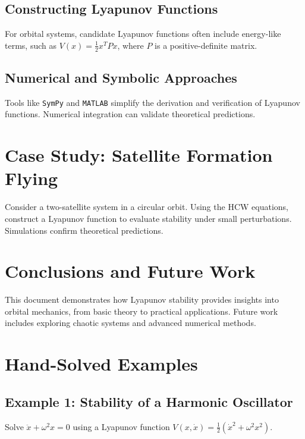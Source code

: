 \documentclass[11pt]{article}
\begin{document}
\subsection{Constructing Lyapunov Functions}
For orbital systems, candidate Lyapunov functions often include energy-like terms, such as $V(x) = \frac{1}{2}x^TPx$, where $P$ is a positive-definite matrix.

\subsection{Numerical and Symbolic Approaches}
Tools like \texttt{SymPy} and \texttt{MATLAB} simplify the derivation and verification of Lyapunov functions. Numerical integration can validate theoretical predictions.

\section{Case Study: Satellite Formation Flying}
Consider a two-satellite system in a circular orbit. Using the HCW equations, construct a Lyapunov function to evaluate stability under small perturbations. Simulations confirm theoretical predictions.

\section{Conclusions and Future Work}
This document demonstrates how Lyapunov stability provides insights into orbital mechanics, from basic theory to practical applications. Future work includes exploring chaotic systems and advanced numerical methods.

\appendix
\section{Hand-Solved Examples}
\subsection{Example 1: Stability of a Harmonic Oscillator}
Solve $\ddot{x} + \omega^2x = 0$ using a Lyapunov function $V(x, \dot{x}) = \frac{1}{2}(\dot{x}^2 + \omega^2x^2)$.
\end{document}
